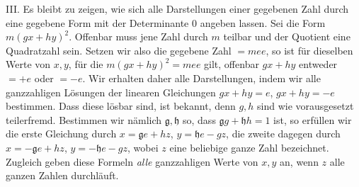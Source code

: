 III. Es bleibt zu zeigen, wie sich alle Darstellungen einer gegebenen Zahl durch eine gegebene Form mit der Determinante 0 angeben lassen. Sei die Form $m(gx+hy)^2$. Offenbar muss jene Zahl durch $m$ teilbar und der Quotient eine Quadratzahl sein. Setzen wir also die gegebene Zahl $=mee$, so ist für dieselben Werte von $x,y$, für die $m(gx+hy)^2=mee$ gilt, offenbar $gx+hy$ entweder $=+e$ oder $=-e$. Wir erhalten daher alle Darstellungen, indem wir alle ganzzahligen Lösungen der linearen Gleichungen $gx+hy=e$, $gx+hy=-e$ bestimmen. Dass diese lösbar sind, ist bekannt, denn $g,h$ sind wie vorausgesetzt teilerfremd. Bestimmen wir nämlich $\mathfrak{g},\mathfrak{h}$ so, dass $\mathfrak{g}g+\mathfrak{h}h=1$ ist, so erfüllen wir die erste Gleichung durch $x=\mathfrak{g}e+hz$, $y=\mathfrak{h}e-gz$, die zweite dagegen durch $x=-\mathfrak{g}e+hz$, $y=-\mathfrak{h}e-gz$, wobei $z$ eine beliebige ganze Zahl bezeichnet. Zugleich geben diese Formeln \textit{alle} ganzzahligen Werte von $x,y$ an, wenn $z$ alle ganzen Zahlen durchläuft.

